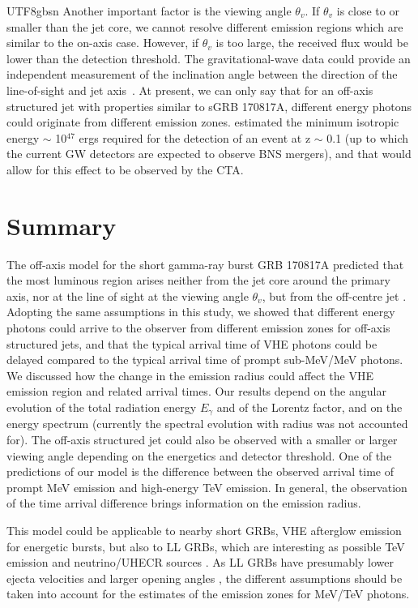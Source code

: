 \documentclass[fleqn,usenatbib]{mnras}
\begin{document}
\begin{CJK*}{UTF8}{gbsn}
Another important factor is the viewing angle $\theta_v$. If $\theta_v$ is close to or smaller than the jet core, we cannot resolve different emission regions which are similar to the on-axis case. However, if $\theta_v$ is too large, the received flux would be lower than the detection threshold.
The gravitational-wave data could provide an independent measurement of the inclination angle between the direction of the line-of-sight and jet axis~\citep{2020ApJ...893...38B}.
At present, we can only say that for an off-axis structured jet with properties similar to sGRB 170817A, different energy photons could originate from different emission zones.  \cite{banerjee22} estimated the minimum isotropic energy $\sim$ 10$^{47}$ ergs required for the detection of an event at z $\sim$ 0.1 (up to which the current GW detectors are expected to observe BNS mergers), and that would allow for this effect to be observed by the CTA. 



\section{Summary}\label{sec:sum}
The off-axis model for the short gamma-ray burst GRB 170817A predicted that the most luminous region arises neither from the jet core around the primary axis, nor at the line of sight at the viewing angle $\theta_v$, but from the off-centre jet \citep{Ioka:2019jlj}. Adopting the same assumptions in this study, we showed that different energy photons could arrive to the observer from different emission zones for off-axis structured jets, and that the typical arrival time of VHE photons could be delayed compared to the typical arrival time of prompt sub-MeV/MeV photons. We discussed how the change in the emission radius could affect the VHE emission region and related arrival times.  Our results depend on the angular evolution of the total radiation energy $E_\gamma$ and of the Lorentz factor, and on the energy spectrum (currently the spectral evolution with radius was not accounted for). The off-axis structured jet could also be observed with a smaller or larger viewing angle depending on the energetics and detector threshold. One of the predictions of our model is the difference between the observed arrival time of prompt MeV emission and high-energy TeV emission. 
In general, the observation of the time arrival difference brings information on the emission radius. 

This model could be applicable to nearby short GRBs, VHE afterglow emission for energetic bursts, but also to LL GRBs, which are interesting as possible TeV emission and neutrino/UHECR sources \citep{murase+2008, mb10, boncioli2019, rudolph:2022}. 
As LL GRBs have presumably lower ejecta velocities and larger opening angles \citep{bromberg2011, cano2017,rudolph:2022}, the 
different assumptions should be taken into account for the estimates of the emission zones for MeV/TeV photons. 




\end{CJK*}
\end{document}
